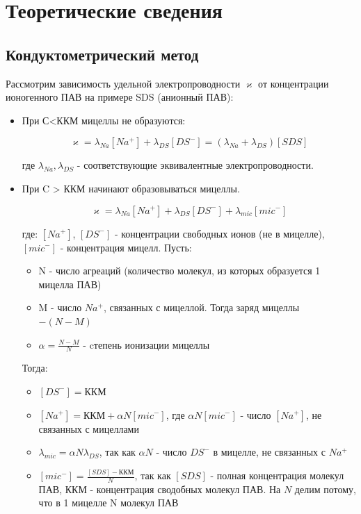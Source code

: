 \documentclass[a4paper,12pt]{article}
\begin{document}
\section{Теоретические сведения}
\subsection{Кондуктометрический метод}
Рассмотрим зависимость удельной электропроводности $\varkappa$ от концентрации ионогенного ПАВ на примере SDS (анионный ПАВ):

\begin{itemize}

\item При С<ККМ мицеллы не образуются:

\begin{equation}\label{c<ккм}
        \varkappa = \lambda_{Na}  [Na^{+}] + \lambda_{DS}  [DS^{-}] = (\lambda_{Na} + \lambda_{DS}) [SDS]
\end{equation}

где $\lambda_{Na},\lambda_{DS}$ - соответствующие эквивалентные электропроводности.

\item При C > ККМ начинают образовываться мицеллы.

\begin{equation}\label{eq1}
    \varkappa = \lambda_{Na}  [Na^{+}] + \lambda_{DS}  [DS^{-}] + \lambda_{mic} [mic^{-}]
\end{equation}

где: $[Na^{+}]$, $[DS^{-}]$ - концентрации свободных ионов (не в мицелле), $[mic^{-}]$ - концентрация мицелл. 
Пусть:
\begin{itemize}
    \item N - число агреаций (количество молекул, из которых образуется 1 мицелла ПАВ)\
    \item  M - число $Na^{{+}}$, связанных с мицеллой. Тогда заряд мицеллы $-(N - M)$\
    \item  $\alpha = \frac{N - M}{N}$ - cтепень ионизации мицеллы
\end{itemize}
Тогда: \begin{itemize}
    \item $[DS^{-}] = \text{ККМ}$
    \item $[Na^{+}] = \text{ККМ} + \alpha N [mic^{-}]$, где $\alpha N [mic^{-}]$ - число $[Na^{+}]$, не связанных с мицеллами
    \item $\lambda_{mic} = \alpha N \lambda_{DS}$, так как $\alpha N$ - число $DS^{-}$ в мицелле, не связанных с $Na^{+}$
    \item $[mic^{-}] = \frac{[SDS] - \text{ККМ}}{N}$, так как $[SDS]$ - полная концентрация молекул ПАВ, $\text{ККМ}$ - концентрация сводобных молекул ПАВ. На $N$ делим потому, что в 1 мицелле N молекул ПАВ
\end{itemize}



\end{itemize}
\end{document}
